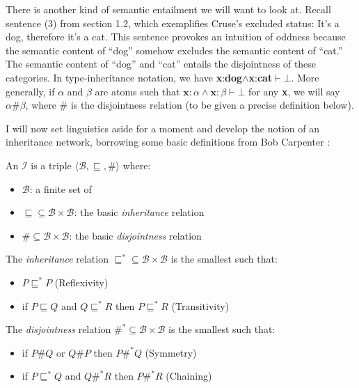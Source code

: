 \documentclass[12pt]{amsart}
\begin{document}
There is another kind of semantic entailment we will want to look at. Recall sentence (3) from section 1.2, which exemplifies Cruse's excluded status: It's a dog, therefore it's a cat. This sentence provokes an intuition of oddness because the semantic content of ``dog'' somehow excludes the semantic content of ``cat.'' The semantic content of ``dog'' and ``cat'' entails the disjointness of these categories. In type-inheritance notation, we have {\bf x}:{\bf dog}$\land${\bf x}:{\bf cat}$\vdash\bot$. More generally, if $\alpha$ and $\beta$ are atoms such that $\textbf{x}:\alpha\land\textbf{x}:\beta\vdash\bot$ for any {\bf x}, we will say $\alpha\#\beta$, where $\#$ is the disjointness relation (to be given a precise definition below).

I will now set linguistics aside for a moment and develop the notion of an inheritance network, borrowing some basic definitions from Bob Carpenter \cite{carpenter_inclusion_1991}:
\par\vspace{5mm}
 An  $\mathcal{I}$ is a triple $\langle\mathcal{B},\sqsubseteq,\#\rangle$ where:
\begin{itemize}
\item $\mathcal{B}$: a finite set of 
\item $\sqsubseteq\subseteq\mathcal{B}\times\mathcal{B}$: the basic \emph{inheritance} relation
\item $\#\subseteq\mathcal{B}\times\mathcal{B}$: the basic \emph{disjointness} relation
\end{itemize}
\par\vspace{5mm}
 The \emph{inheritance} relation $\sqsubseteq^*\subseteq\mathcal{B}\times\mathcal{B}$ is the smallest such that:
\begin{itemize}
\item $P\sqsubseteq^*P$  (Reflexivity)
\item if $P\sqsubseteq Q$ and $Q\sqsubseteq^*R$ then $P\sqsubseteq^*R$ (Transitivity)
\end{itemize}
The \emph{disjointness} relation $\#^*\subseteq\mathcal{B}\times\mathcal{B}$ is the smallest such that:
\begin{itemize}
\item if $P\#Q$ or $Q\#P$ then $P\#^*Q$ (Symmetry)
\item if $P\sqsubseteq^*Q$ and $Q\#^*R$ then $P\#^*R$ (Chaining)
\end{itemize}
\end{document}
